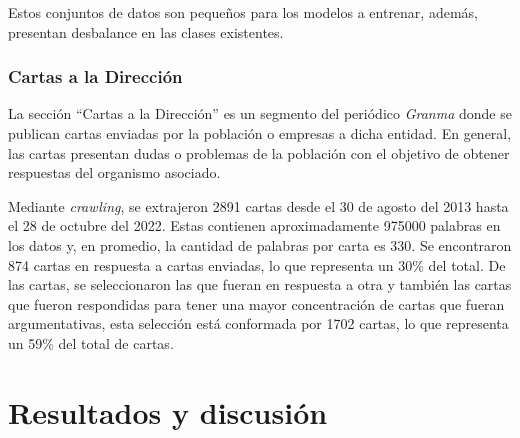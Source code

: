\documentclass{rcci} %
\begin{document}
Estos conjuntos de datos son peque\~nos para los modelos a entrenar, adem\'as, presentan desbalance en las clases 
existentes.

\subsubsection*{Cartas a la Direcci\'on}

La secci\'on ``Cartas a la Direcci\'on'' \citep{gallego2013cartas} es un segmento del peri\'odico \textit{Granma} donde se publican
cartas enviadas por la poblaci\'on o empresas a dicha entidad. En general, las cartas 
presentan dudas o problemas de la poblaci\'on con el objetivo de obtener respuestas del organismo
asociado. 

Mediante \textit{crawling}, se extrajeron 2891 cartas desde el 30 de agosto del 2013 hasta el 28 de octubre del 2022. Estas 
contienen aproximadamente 975000 palabras en los datos y, en promedio, la cantidad de palabras por carta es 330.
Se encontraron 874 cartas en respuesta a cartas enviadas, lo que representa un 30\% del total. 
De las cartas, se seleccionaron las que fueran en respuesta a otra y tambi\'en las 
cartas que fueron respondidas para tener una mayor concentraci\'on de cartas que fueran argumentativas, 
esta selecci\'on est\'a conformada por 1702 cartas, lo que representa un 59\% del total de cartas.

\section*{Resultados y discusi\'on}



\end{document}
